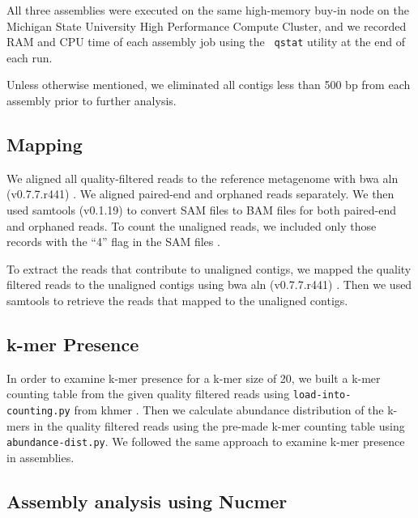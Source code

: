 \documentclass[10pt,a4paper,twocolumn]{article}
\begin{document}
All three assemblies were executed on the same high-memory buy-in node
on the Michigan State University High Performance Compute Cluster, and
we recorded RAM and CPU time of each assembly job using the {\tt
  qstat} utility at the end of each run.

Unless otherwise mentioned, we eliminated all contigs less than 500 bp
from each assembly prior to further analysis.

\subsection*{Mapping}

We aligned all quality-filtered reads to the reference metagenome with
bwa aln (v0.7.7.r441) \cite{bwa}. We aligned paired-end and orphaned
reads separately. We then used samtools (v0.1.19)
\cite{sam-stools} to convert SAM files to BAM files for both
paired-end and orphaned reads. To count the unaligned reads, we
included only those records with the ``4'' flag in the SAM files
\cite{sam-stools}.
 

To extract the reads that contribute to unaligned contigs, we mapped
the quality filtered reads to the unaligned contigs using bwa aln
(v0.7.7.r441) \cite{bwa}.  Then we used samtools to retrieve the reads
that mapped to the unaligned contigs.





\subsection*{k-mer Presence}
In order to examine k-mer presence for a k-mer size of 20, we built a
k-mer counting table from the given quality filtered reads using
{\tt{load-into-counting.py}} from khmer \cite{khmer2016}. Then we
calculate abundance distribution of the k-mers in the quality filtered
reads using the pre-made k-mer counting table using
{\tt{abundance-dist.py}}. We followed the same approach to examine
k-mer presence in assemblies.

\subsection*{Assembly analysis using Nucmer}
\end{document}
